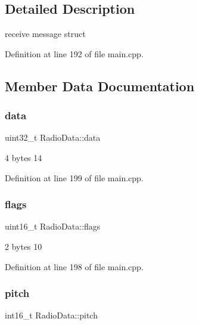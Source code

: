 \subsection{Detailed Description}
receive message struct 

Definition at line 192 of file main.\+cpp.



\subsection{Member Data Documentation}
\mbox{\label{structRadioData_a81f0599626e9bd8e665e121e93fb2828}} 
\subsubsection{\texorpdfstring{data}{data}}
{\footnotesize\ttfamily uint32\+\_\+t Radio\+Data\+::data}



4 bytes 14 



Definition at line 199 of file main.\+cpp.

\mbox{\label{structRadioData_a9f2953e3cc37197626626a999842e74d}} 
\subsubsection{\texorpdfstring{flags}{flags}}
{\footnotesize\ttfamily uint16\+\_\+t Radio\+Data\+::flags}



2 bytes 10 



Definition at line 198 of file main.\+cpp.

\mbox{\label{structRadioData_a88551ed8975dd848369ddf8f3511743c}} 
\subsubsection{\texorpdfstring{pitch}{pitch}}
{\footnotesize\ttfamily int16\+\_\+t Radio\+Data\+::pitch}



